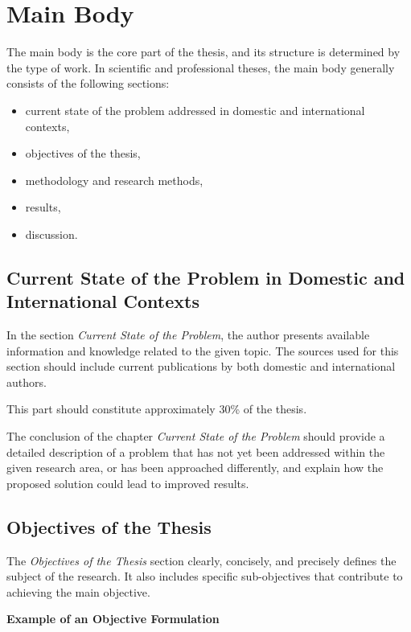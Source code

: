 \section{Main Body} 

The main body is the core part of the thesis, and its structure is determined by the type of work. In scientific and professional theses, the main body generally consists of the following sections: 

\begin{itemize} 
	\item current state of the problem addressed in domestic and international contexts, 
	\item objectives of the thesis, 
	\item methodology and research methods, 
	\item results, 
	\item discussion. 
\end{itemize} 

\subsection{Current State of the Problem in Domestic and International Contexts} 

In the section \textit{Current State of the Problem}, the author presents available information and knowledge related to the given topic. The sources used for this section should include current publications by both domestic and international authors. 

This part should constitute approximately 30\% of the thesis. 

The conclusion of the chapter \textit{Current State of the Problem} should provide a detailed description of a problem that has not yet been addressed within the given research area, or has been approached differently, and explain how the proposed solution could lead to improved results. 

\subsection{Objectives of the Thesis} 

The \textit{Objectives of the Thesis} section clearly, concisely, and precisely defines the subject of the research. It also includes specific sub-objectives that contribute to achieving the main objective. 

\textbf{Example of an Objective Formulation}

